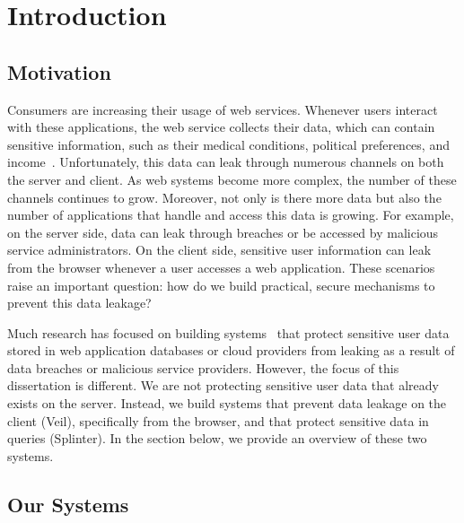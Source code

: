\section{Introduction}
\label{chap:intro}

\subsection{Motivation}
Consumers are increasing their usage of web services. Whenever
users interact with these applications, the web service collects
their data, which can contain sensitive 
information, such as their medical conditions,
political preferences, and income~\cite{narayanan2010myths, narayanan2008robust}.
Unfortunately, this data can 
leak through numerous channels on both the server
and client. As web systems become more complex, the 
number of these channels continues to grow. Moreover,
not only is there more data but also the number of 
applications that handle and access this data is growing.
For example, on the server side, data can leak through breaches
or be accessed by malicious service administrators. On the client side,
sensitive user information can leak from the browser whenever
a user accesses a web application. These scenarios raise an important
question: how do we build practical, secure
mechanisms to prevent this data leakage?


Much research has focused on building systems~\cite{popa:mylar, popa:cryptdb, li:sundr, feldman:sporc} 
that protect sensitive user data stored in web application databases
or cloud providers from leaking as a result of data breaches or malicious service
providers. However, the focus of
this dissertation is different. We are not protecting sensitive 
user data that already exists on the server.
Instead, we build systems
that prevent data leakage on the client (Veil), specifically
from the browser, and that protect sensitive data in queries (Splinter).
In the section below, we provide an overview of these two systems.

\subsection{Our Systems}

